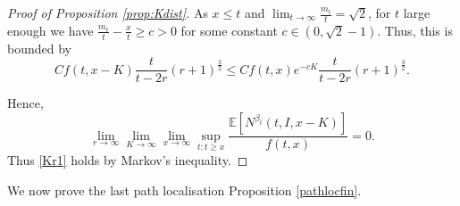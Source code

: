 \documentclass{article}
\newcommand{\E}[0]{\mathbb{E}}
\begin{document}
\begin{proof}[Proof of Proposition \ref{prop:Kdist}]
As $x\leq t$ and $\lim_{t \to \infty} \frac{m_t}{t} = \sqrt{2}$, for $t$ large enough we have $\frac{m_t}{t} - \frac{x}{t} \geq c > 0$ for some constant $c \in (0, \sqrt{2}-1)$. Thus, this is bounded by
\begin{equation}
         Cf(t,x-K)\frac{t}{t-2r}(r+1)^{\frac{3}{2}} \leq Cf(t,x) e^{-cK}\frac{t}{t-2r}(r+1)^{\frac{3}{2}} .
\end{equation}


Hence,
\begin{equation}
    \lim_{r\to \infty}\lim_{K\to\infty} \lim_{x\to\infty} \sup_{t: t\geq x}\frac{\E\left[ N^{\beta_t}(t,I,x-K) \right]}{f(t,x)} = 0.
\end{equation}
Thus  \eqref{Kr1} holds by Markov's inequality.
\end{proof}


We now prove the last path localisation Proposition \ref{pathlocfin}.
\end{document}
